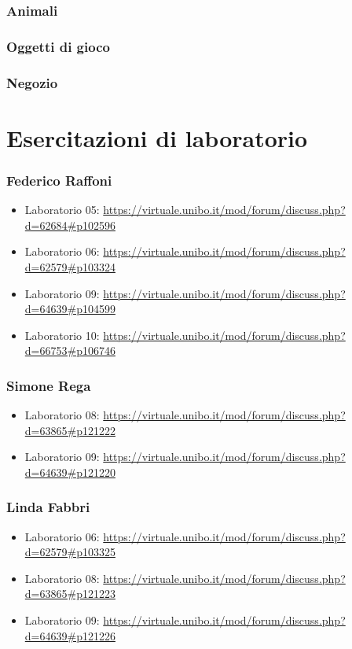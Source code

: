 \documentclass[a4paper,12pt]{report}
\begin{document}
	

\subsection{Animali}
	\label{animali}

\subsection{Oggetti di gioco}

\subsection{Negozio}

\chapter{Esercitazioni di laboratorio}

\subsection{Federico Raffoni}

\begin{itemize}
 \item Laboratorio 05: \url{https://virtuale.unibo.it/mod/forum/discuss.php?d=62684#p102596}
 \item Laboratorio 06: \url{https://virtuale.unibo.it/mod/forum/discuss.php?d=62579#p103324}
 \item Laboratorio 09: \url{https://virtuale.unibo.it/mod/forum/discuss.php?d=64639#p104599}
 \item Laboratorio 10: \url{https://virtuale.unibo.it/mod/forum/discuss.php?d=66753#p106746}
\end{itemize}

\subsection{Simone Rega}

\begin{itemize}
	\item Laboratorio 08: \url{https://virtuale.unibo.it/mod/forum/discuss.php?d=63865#p121222}
	\item Laboratorio 09: \url{https://virtuale.unibo.it/mod/forum/discuss.php?d=64639#p121220}
\end{itemize}

\subsection{Linda Fabbri}

\begin{itemize}
	\item Laboratorio 06:
	\url{https://virtuale.unibo.it/mod/forum/discuss.php?d=62579#p103325}
	\item Laboratorio 08: \url{https://virtuale.unibo.it/mod/forum/discuss.php?d=63865#p121223}
	\item Laboratorio 09: \url{https://virtuale.unibo.it/mod/forum/discuss.php?d=64639#p121226}
\end{itemize}


\end{document}

